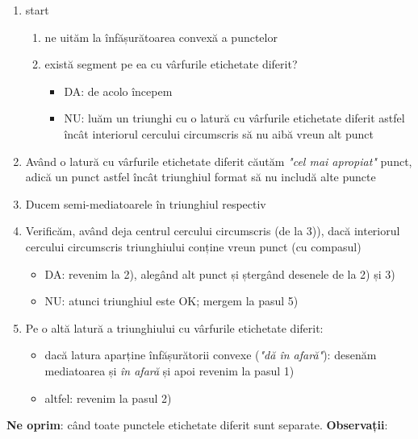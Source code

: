 \documentclass[12pt]{article}
\begin{document}
	\begin{enumerate}
		\item start
		\begin{enumerate}
			\item ne uităm la înfășurătoarea convexă a punctelor
			\item există segment pe ea cu vârfurile etichetate diferit?
			\begin{itemize}
				\item DA: de acolo începem
				\item NU: luăm un triunghi cu o latură cu vârfurile etichetate diferit astfel încât interiorul cercului circumscris să nu aibă vreun alt punct
			\end{itemize}
		\end{enumerate}
	 	\item Având o latură cu vârfurile etichetate diferit căutăm \textit{"cel mai apropiat"} punct, adică un punct astfel încât triunghiul format să nu includă alte puncte
	 	\item Ducem semi-mediatoarele în triunghiul respectiv
	 	\item Verificăm, având deja centrul cercului circumscris (de la 3)), dacă interiorul cercului circumscris triunghiului conține vreun punct (cu compasul)
	 	\begin{itemize}
	 		\item DA: revenim la 2), alegând alt punct și ștergând desenele de la 2) și 3)
	 		\item NU: atunci triunghiul este OK; mergem la pasul 5)
	 	\end{itemize}
 		\item Pe o altă latură a triunghiului cu vârfurile etichetate diferit:
 		\begin{itemize}
 			\item dacă latura aparține înfășurătorii convexe (\textit{"dă în afară"}): desenăm mediatoarea și \textit{în afară} și apoi revenim la pasul 1)
 			\item altfel: revenim la pasul 2)
 		\end{itemize}
	\end{enumerate}
	\textbf{Ne oprim}: când toate punctele etichetate diferit sunt separate.
	\newpage
	\textbf{Observații}:
\end{document}
